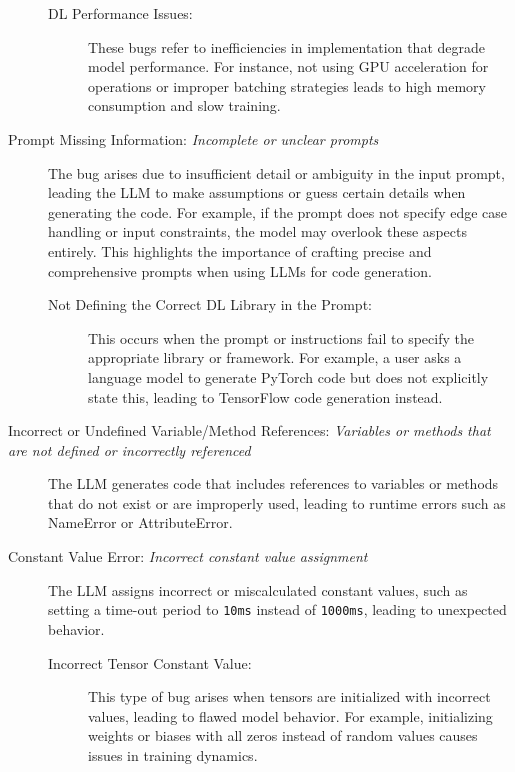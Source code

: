 \begin{description}
\begin{description}
    \item[DL Performance Issues:] These bugs refer to inefficiencies in implementation that degrade model performance. For instance, not using GPU acceleration for operations or improper batching strategies leads to high memory consumption and slow training.
\end{description}

\item[Prompt Missing Information: \textit{Incomplete or unclear prompts}]
The bug arises due to insufficient detail or ambiguity in the input prompt, leading the LLM to make assumptions or guess certain details when generating the code. For example, if the prompt does not specify edge case handling or input constraints, the model may overlook these aspects entirely. This highlights the importance of crafting precise and comprehensive prompts when using LLMs for code generation.

\begin{description}
    \item[Not Defining the Correct DL Library in the Prompt:] This occurs when the prompt or instructions fail to specify the appropriate library or framework. For example, a user asks a language model to generate PyTorch code but does not explicitly state this, leading to TensorFlow code generation instead.
\end{description}

\item[Incorrect or Undefined Variable/Method References: \textit{Variables or methods that are not defined or incorrectly referenced}]
The LLM generates code that includes references to variables or methods that do not exist or are improperly used, leading to runtime errors such as NameError or AttributeError.

\item[Constant Value Error: \textit{Incorrect constant value assignment}]
The LLM assigns incorrect or miscalculated constant values, such as setting a time-out period to \texttt{10ms} instead of \texttt{1000ms}, leading to unexpected behavior.
\begin{description}
    \item[Incorrect Tensor Constant Value:] This type of bug arises when tensors are initialized with incorrect values, leading to flawed model behavior. For example, initializing weights or biases with all zeros instead of random values causes issues in training dynamics.
\end{description}

\end{description}

